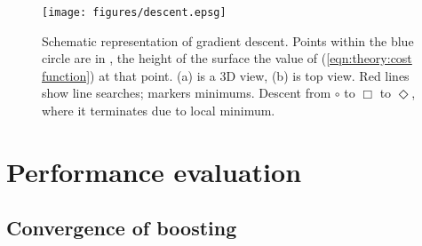 \begin{figure}
\begin{center}
\texttt{[image: figures/descent.epsg]}
\caption{Schematic representation of gradient descent.  Points within the blue
circle are in \calF, the height of the surface the value of
(\ref{eqn:theory:cost function}) at that point.  (a) is a 3D view, (b)
is top view. Red lines show line searches; markers minimums.  Descent
from $\circ$ to $\Box$ to $\Diamond$, where it terminates due to
local minimum.}
\label{fig:gradient descent}
\end{center}
\end{figure}


\section{Performance evaluation}


\subsection{Convergence of boosting}

